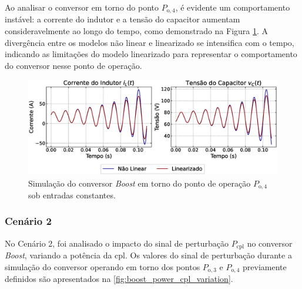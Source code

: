 Ao analisar o conversor em torno do ponto $P_{\mathrm{o}, 4}$, é evidente um comportamento instável: a corrente do indutor e a tensão do capacitor aumentam consideravelmente ao longo do tempo, como demonstrado na Figura \ref{fig:simulation_1_boost_2}. A divergência entre os modelos não linear e linearizado se intensifica com o tempo, indicando as limitações do modelo linearizado para representar o comportamento do conversor nesse ponto de operação.

\begin{figure}[H]
  \centering
  \captionsetup{justification=centering}
  \includegraphics[width=1.\textwidth]{figuras/boost/sim1/op2/result.eps}
  \caption{Simulação do conversor \textit{Boost} em torno do ponto de operação $P_{\mathrm{o}, 4}$ sob entradas constantes.}
  \label{fig:simulation_1_boost_2}
\end{figure}

\subsubsection{Cenário 2}

No Cenário 2, foi analisado o impacto do sinal de perturbação $P_{\mathrm{cpl}}$ no conversor \textit{Boost}, variando a potência da \acrshort{cpl}. Os valores do sinal de perturbação durante a simulação do conversor operando em torno dos pontos $P_{\mathrm{o}, 3}$ e $P_{\mathrm{o}, 4}$ previamente definidos são apresentados na \autoref{fig:boost_power_cpl_variation}.

